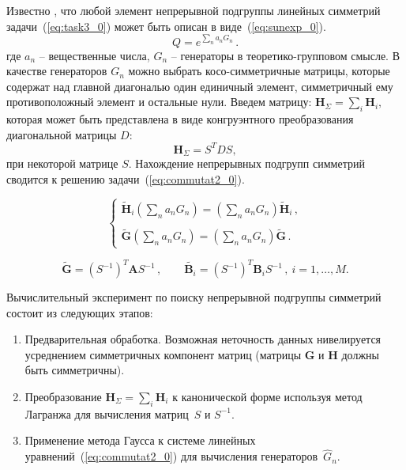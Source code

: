 Известно , что любой элемент непрерывной подгруппы линейных симметрий задачи~(\ref{eq:task3_0}) может быть описан в виде~(\ref{eq:sunexp_0}).
\begin{equation}
\label{eq:sunexp_0}
Q=e^{\sum\limits_n a_n G_n} \, .
\end{equation}
где $a_n$ -- вещественные числа, $G_n$ -- генераторы в теоретико-групповом смысле. В качестве генераторов $G_n$ можно выбрать косо-симметричные матрицы, которые содержат над главной диагональю один единичный элемент, симметричный ему противоположный элемент и остальные нули.
Введем матрицу: $ {\textbf{H}}_{\Sigma} = \sum_{i} \textbf{H}_i,$ которая может быть представлена в виде конгруэнтного преобразования диагональной матрицы $D$:
$${\textbf{H}}_{\Sigma} = S^TDS,$$
при некоторой матрице $S$.
Нахождение непрерывных подгрупп симметрий сводится к решению задачи~(\ref{eq:commutat2_0}).

\begin{equation}
\label{eq:commutat2_0}
\left\{
\begin{array}{l}
\displaystyle
\tilde{\textbf{H}}_i \left(\sum\limits_na_nG_n\right) =
\left(\sum\limits_na_nG_n\right)\tilde{\textbf{H}}_i \, , \\ \\
\displaystyle
\tilde{\textbf{G}} \left(\sum\limits_na_nG_n\right) = \left(\sum\limits_na_nG_n\right)\tilde{\textbf{G}} \, .
\end{array}
\right.
\end{equation}

\begin{equation}
\tilde{\textbf{G}}=\left(S^{-1}\right)^T \textbf{A} S^{-1} \, , \qquad
\tilde{\textbf{B}_i}=\left(S^{-1}\right)^T \textbf{B}_i S^{-1} \, , \ i=1,\dots,M.
\end{equation}

Вычислительный эксперимент по поиску непрерывной подгруппы симметрий состоит из следующих этапов:
\begin{enumerate}
  \item Предварительная обработка. Возможная неточность данных нивелируется усреднением симметричных компонент матриц (матрицы $\textbf{G}$ и $\textbf{H}$ должны быть симметричны).
  \item %
  Преобразование $ {\textbf{H}}_{\Sigma} = \sum_{i} \textbf{H}_i$ к канонической форме используя метод Лагранжа для вычисления матриц~$S$ и $S^{-1} $.
  \item Применение метода Гаусса к системе линейных уравнений~(\ref{eq:commutat2_0}) для вычисления генераторов~$\hat{G}_n$.
\end{enumerate}


